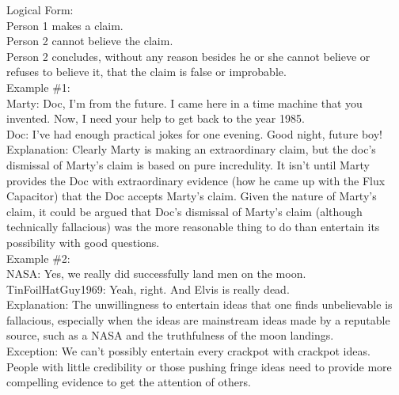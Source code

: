 \documentclass[a4paper,12pt,single,pdftex]{scrartcl}
\begin{document}
{    
      Logical Form:
    \\

    
      Person 1 makes a claim.
    \\

    
      Person 2 cannot believe the claim.
    \\

    
      Person 2 concludes, without any reason besides he or she cannot believe or refuses to believe it, that the claim is false or improbable.
    \\

    
      Example \#1:
    \\

    
      Marty: Doc, I'm from the future. I came here in a time machine that you invented. Now, I need your help to get back to the year 1985.
    \\

    
      Doc: I've had enough practical jokes for one evening. Good night, future boy!
    \\

    
      Explanation: Clearly Marty is making an extraordinary claim, but the doc's dismissal of Marty's claim is based on pure incredulity. It isn't until Marty provides the Doc with extraordinary evidence (how he came up with the Flux Capacitor) that the Doc accepts Marty's claim. Given the nature of Marty's claim, it could be argued that Doc's dismissal of Marty's claim (although technically fallacious) was the more reasonable thing to do than entertain its possibility with good questions.
    \\

    
      Example \#2:
    \\

    
      NASA: Yes, we really did successfully land men on the moon.
    \\

    
      TinFoilHatGuy1969: Yeah, right. And Elvis is really dead.
    \\

    
      Explanation: The unwillingness to entertain ideas that one finds unbelievable is fallacious, especially when the ideas are mainstream ideas made by a reputable source, such as a NASA and the truthfulness of the moon landings.
    \\

    
      Exception: We can't possibly entertain every crackpot with crackpot ideas. People with little credibility or those pushing fringe ideas need to provide more compelling evidence to get the attention of others.
    \\

}
\end{document}
